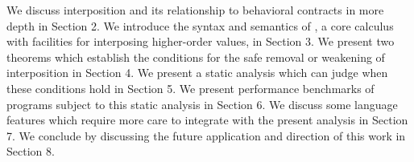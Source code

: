 \documentclass{sigplanconf}
\begin{document}








We discuss interposition and its relationship to behavioral contracts in more depth in Section 2.
We introduce the syntax and semantics of \chapcalc, a core calculus with facilities for interposing higher-order values, in Section 3.
We present two theorems which establish the conditions for the safe removal or weakening of interposition in Section 4.
We present a static analysis which can judge when these conditions hold in Section 5.
We present performance benchmarks of programs subject to this static analysis in Section 6.
We discuss some language features which require more care to integrate with the present analysis in Section 7.
We conclude by discussing the future application and direction of this work in Section 8.
\end{document}
